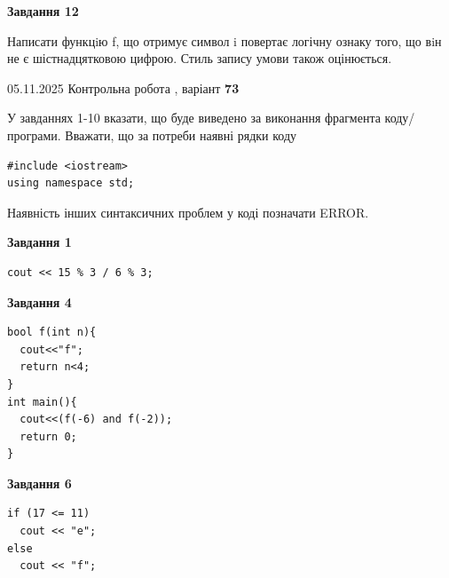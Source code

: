 \documentclass[12pt, ukrainian]{article}
\begin{document}
{\begin {large}
\begin{minipage}[t]{11.0cm}
\begin{center}
\textbf{Завдання 12}
\end{center}

Написати функцiю f, що отримує символ i повертає логічну ознаку того, що вiн не є шістнадцятковою цифрою. Стиль запису умови також оцінюється.\par

\end{minipage}

\end {large}}
\newpage

{\Large{05.11.2025 Контрольна робота , варіант  \No \textbf { 73 }\par}}
{
\begin {large}
У завданнях 1-10 вказати, що буде виведено за виконання фрагмента коду/про\-гра\-ми.
Вважати, що за потреби наявні рядки коду
\begin{verbatim}
#include <iostream>
using namespace std;
\end{verbatim}
Наявність інших синтаксичних проблем у коді позначати ERROR.

\begin{minipage}[t]{7.0cm}

\begin{center}
\textbf{Завдання 1}
\end{center}
\vspace{-8mm}

\begin{verbatim}
cout << 15 % 3 / 6 % 3;
\end{verbatim}



\begin{center}
\textbf{Завдання 4}
\end{center}
\vspace{-8mm}

\begin{verbatim}
bool f(int n){
  cout<<"f";
  return n<4;
}
int main(){
  cout<<(f(-6) and f(-2));
  return 0;
}
\end{verbatim}



\begin{center}
\textbf{Завдання 6}
\end{center}
\vspace{-8mm}

\begin{verbatim}
if (17 <= 11)
  cout << "e";
else
  cout << "f";
\end{verbatim}




\end{minipage}
\end{large}}
\end{document}

